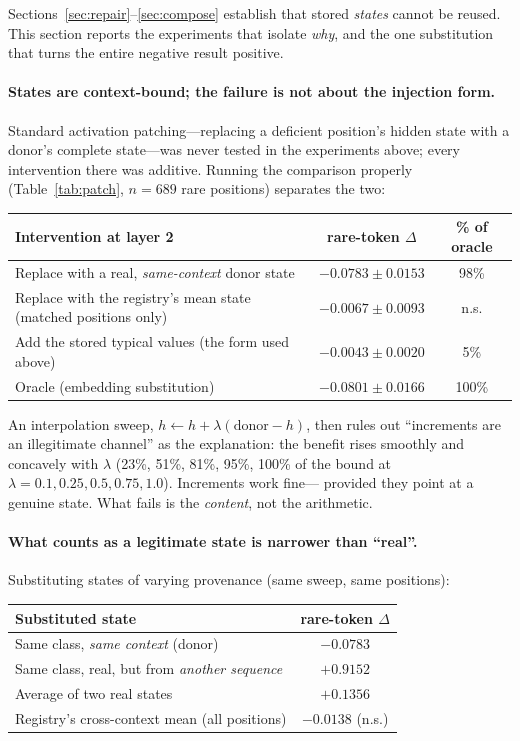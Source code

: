 \documentclass[11pt]{article}
\begin{document}
Sections~\ref{sec:repair}--\ref{sec:compose} establish that stored \emph{states}
cannot be reused. This section reports the experiments that isolate \emph{why},
and the one substitution that turns the entire negative result positive.

\paragraph{States are context-bound; the failure is not about the injection
form.} Standard activation patching---replacing a deficient position's hidden
state with a donor's complete state---was never tested in the experiments above;
every intervention there was additive. Running the comparison properly
(Table~\ref{tab:patch}, $n{=}689$ rare positions) separates the two:

\begin{center}
\small
\begin{tabular}{@{}lcc@{}}
\toprule
Intervention at layer 2 & rare-token $\Delta$ & \% of oracle \\
\midrule
Replace with a real, \emph{same-context} donor state & $-0.0783 \pm 0.0153$ & 98\% \\
Replace with the registry's mean state (matched positions only) & $-0.0067 \pm 0.0093$ & n.s. \\
Add the stored typical values (the form used above) & $-0.0043 \pm 0.0020$ & 5\% \\
Oracle (embedding substitution) & $-0.0801 \pm 0.0166$ & 100\% \\
\bottomrule
\end{tabular}
\end{center}
\label{tab:patch}

An interpolation sweep, $h \leftarrow h + \lambda(\text{donor} - h)$, then rules
out ``increments are an illegitimate channel'' as the explanation: the benefit
rises smoothly and concavely with $\lambda$ (23\%, 51\%, 81\%, 95\%, 100\% of
the bound at $\lambda = 0.1, 0.25, 0.5, 0.75, 1.0$). Increments work fine---
provided they point at a genuine state. What fails is the \emph{content}, not
the arithmetic.

\paragraph{What counts as a legitimate state is narrower than ``real''.}
Substituting states of varying provenance (same sweep, same positions):

\begin{center}
\small
\begin{tabular}{@{}lc@{}}
\toprule
Substituted state & rare-token $\Delta$ \\
\midrule
Same class, \emph{same context} (donor) & $-0.0783$ \\
Same class, real, but from \emph{another sequence} & $+0.9152$ \\
Average of two real states & $+0.1356$ \\
Registry's cross-context mean (all positions) & $-0.0138$ (n.s.) \\
\bottomrule
\end{tabular}
\end{center}
\end{document}
